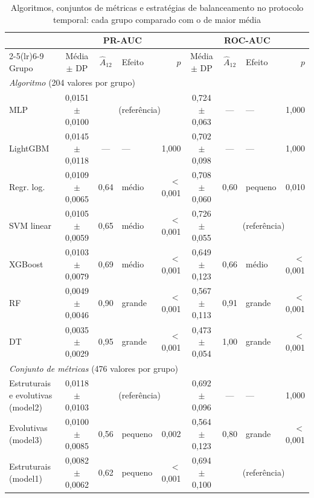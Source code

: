 \begin{table}[htbp]
    
    \centering
    \scriptsize
    \setlength{\tabcolsep}{3pt}%
    \caption{Algoritmos, conjuntos de métricas e estratégias de balanceamento no protocolo temporal: cada grupo comparado com o de maior média}
    \label{tab:res-a12-fatores}
    \begin{tabular}{lcclrcclr}
        \toprule
         & \multicolumn{4}{c}{PR-AUC} & \multicolumn{4}{c}{ROC-AUC} \\
        \cmidrule(lr){2-5}\cmidrule(lr){6-9}
        Grupo & Média $\pm$ DP & $\hat{A}_{12}$ & Efeito & $p$ & Média $\pm$ DP & $\hat{A}_{12}$ & Efeito & $p$ \\
        \midrule
        \multicolumn{9}{l}{\textit{Algoritmo} (204 valores por grupo)} \\
        \quad MLP & 0,0151 $\pm$ 0,0100 & \multicolumn{3}{c}{(referência)} & 0,724 $\pm$ 0,063 & --- & --- & 1,000 \\
        \quad LightGBM & 0,0145 $\pm$ 0,0118 & --- & --- & 1,000 & 0,702 $\pm$ 0,098 & --- & --- & 1,000 \\
        \quad Regr. log. & 0,0109 $\pm$ 0,0065 & 0,64 & médio & $<$ 0,001 & 0,708 $\pm$ 0,060 & 0,60 & pequeno & 0,010 \\
        \quad SVM linear & 0,0105 $\pm$ 0,0059 & 0,65 & médio & $<$ 0,001 & 0,726 $\pm$ 0,055 & \multicolumn{3}{c}{(referência)} \\
        \quad XGBoost & 0,0103 $\pm$ 0,0079 & 0,69 & médio & $<$ 0,001 & 0,649 $\pm$ 0,123 & 0,66 & médio & $<$ 0,001 \\
        \quad RF & 0,0049 $\pm$ 0,0046 & 0,90 & grande & $<$ 0,001 & 0,567 $\pm$ 0,113 & 0,91 & grande & $<$ 0,001 \\
        \quad DT & 0,0035 $\pm$ 0,0029 & 0,95 & grande & $<$ 0,001 & 0,473 $\pm$ 0,054 & 1,00 & grande & $<$ 0,001 \\
        \midrule
        \multicolumn{9}{l}{\textit{Conjunto de métricas} (476 valores por grupo)} \\
        \quad Estruturais e evolutivas (model2) & 0,0118 $\pm$ 0,0103 & \multicolumn{3}{c}{(referência)} & 0,692 $\pm$ 0,096 & --- & --- & 1,000 \\
        \quad Evolutivas (model3) & 0,0100 $\pm$ 0,0085 & 0,56 & pequeno & 0,002 & 0,564 $\pm$ 0,123 & 0,80 & grande & $<$ 0,001 \\
        \quad Estruturais (model1) & 0,0082 $\pm$ 0,0062 & 0,62 & pequeno & $<$ 0,001 & 0,694 $\pm$ 0,100 & \multicolumn{3}{c}{(referência)} \\

\end{tabular}
\end{table}

